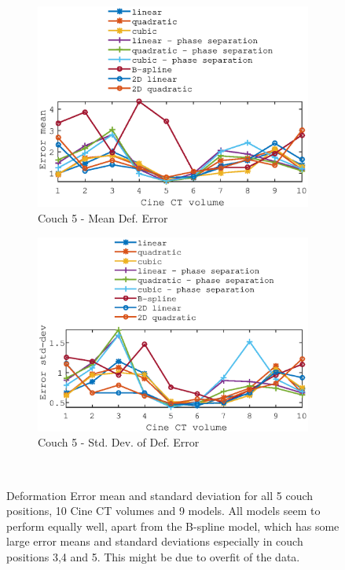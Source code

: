 \documentclass[11pt,a4paper,oneside]{report}
\begin{document}
\begin{figure}
\begin{subfigure}[b]{0.5\textwidth}
    \includegraphics[width=\textwidth, trim=0 0 0 \trimval,clip=true]{figures/task4/def_mean_error_couch5.eps}
    \caption{Couch 5 - Mean Def. Error}
  \end{subfigure}%
  \begin{subfigure}[b]{0.5\textwidth}
    \includegraphics[width=\textwidth, trim=0 0 0 \trimval,clip=true]{figures/task4/def_stddev_error_couch5.eps}
    \caption{Couch 5 - Std. Dev. of Def. Error}
  \end{subfigure}
  ~
  \caption{Deformation Error mean and standard deviation for all 5 couch positions, 10 Cine CT volumes and 9 models. All models seem to perform equally well, apart from the B-spline model, which has some large error means and standard deviations especially in couch positions 3,4 and 5. This might be due to overfit of the data.}
  \label{fig:c4defError}
  
\end{figure}
\end{document}
